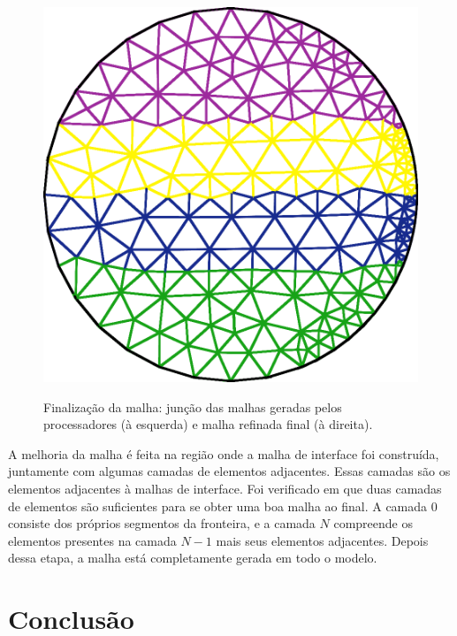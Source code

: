 \begin{figure}[!ht]
{		\begin{minipage}[c]{0.35\textwidth}{\includegraphics[width=\textwidth]{fig/finaliza2.png}}\end{minipage}
	}
	\caption{Finalização da malha: junção das malhas geradas pelos processadores (à esquerda) e malha refinada final (à direita).}
	\label{fig:finaliza}
\end{figure}

A melhoria da malha é feita na região onde a malha de interface foi construída, juntamente com algumas camadas de elementos adjacentes. Essas camadas são os elementos adjacentes à malhas de interface. Foi verificado em \cite{bib:Ito07} que duas camadas de elementos são suficientes para se obter uma boa malha ao final. A camada $0$ consiste dos próprios segmentos da fronteira, e a camada $N$ compreende os elementos presentes na camada $N-1$ mais seus elementos adjacentes. Depois dessa etapa, a malha está completamente gerada em todo o modelo.


\section{Conclusão}
